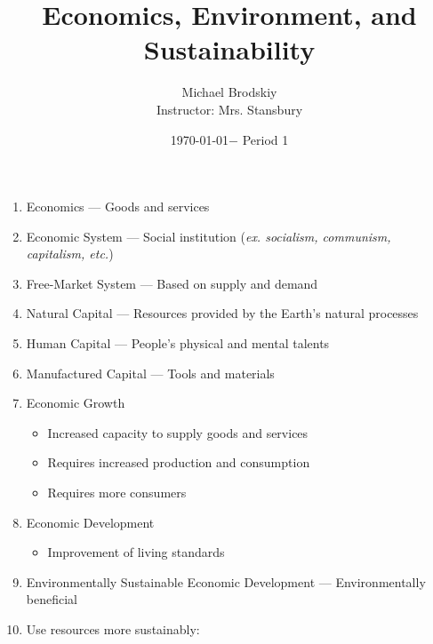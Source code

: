 \documentclass[12pt]{article}
\title{Economics, Environment, and Sustainability}
\date{\today $-$ Period 1}
\author{Michael Brodskiy\\ \small Instructor: Mrs. Stansbury}
\begin{document}
\maketitle

\begin{enumerate}

  \item Economics — Goods and services

  \item Economic System — Social institution (\textit{ex. socialism, communism, capitalism, etc.})

  \item Free-Market System — Based on supply and demand

  \item Natural Capital — Resources provided by the Earth's natural processes

  \item Human Capital — People's physical and mental talents

  \item Manufactured Capital — Tools and materials

  \item Economic Growth

    \begin{itemize}

      \item Increased capacity to supply goods and services

      \item Requires increased production and consumption

      \item Requires more consumers

    \end{itemize}

  \item Economic Development

    \begin{itemize}

      \item Improvement of living standards

    \end{itemize}

  \item Environmentally Sustainable Economic Development — Environmentally beneficial

  \item Use resources more sustainably:


\end{enumerate}
\end{document}
